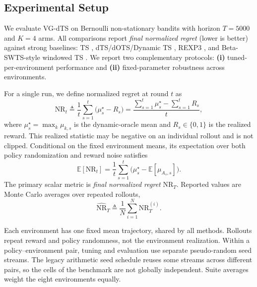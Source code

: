 \documentclass{article}
\begin{document}
\subsection{Experimental Setup}
We evaluate VG-dTS on Bernoulli non-stationary bandits with horizon $T=5000$ and $K=4$ arms.
All comparisons report \emph{final normalized regret} (lower is better) against strong baselines:
TS \cite{thompson1933,russo2018tutorial}, dTS/dOTS/Dynamic TS \cite{raj2017taming}, REXP3 \cite{besbes2014,auer2002nonstochastic}, and Beta-SWTS-style windowed TS \cite{trovo2020}.
We report two complementary protocols:
\textbf{(i)} tuned-per-environment performance and
\textbf{(ii)} fixed-parameter robustness across environments.

For a single run, we define normalized regret at round $t$ as
\begin{equation}
\mathrm{NR}_t
\triangleq
\frac{1}{t}\sum_{s=1}^{t}\bigl(\mu_s^\star-R_s\bigr)
=
\frac{\sum_{s=1}^{t}\mu_s^\star-\sum_{s=1}^{t}R_s}{t},
\label{eq:nr_def}
\end{equation}
where $\mu_s^\star=\max_k\mu_{k,s}$ is the dynamic-oracle mean and $R_s\in\{0,1\}$ is the realized reward.
This realized statistic may be negative on an individual rollout and is not clipped. Conditional on the fixed environment means, its expectation over both policy randomization and reward noise satisfies
\[
\mathbb{E}[\mathrm{NR}_t]
=
\frac{1}{t}\sum_{s=1}^{t}\bigl(\mu_s^\star-\mathbb{E}[\mu_{A_s,s}]\bigr).
\]
The primary scalar metric is \emph{final normalized regret} $\mathrm{NR}_T$.
Reported values are Monte Carlo averages over repeated rollouts,
\begin{equation}
\widehat{\mathrm{NR}}_T
\triangleq
\frac{1}{N}\sum_{i=1}^{N}\mathrm{NR}^{(i)}_T.
\label{eq:nr_mc}
\end{equation}

Each environment has one fixed mean trajectory, shared by all methods. Rollouts repeat reward and policy randomness, not the environment realization. Within a policy--environment pair, tuning and evaluation use separate pseudo-random seed streams. The legacy arithmetic seed schedule reuses some streams across different pairs, so the cells of the benchmark are not globally independent. Suite averages weight the eight environments equally.
\end{document}
